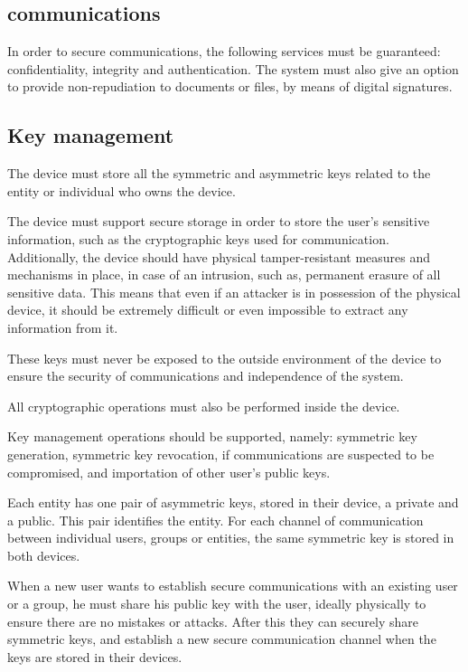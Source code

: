 \subsection{communications} \label{chap:problem:services:comms}
In order to secure communications, the following services must be guaranteed: confidentiality, integrity and authentication.
The system must also give an option to provide non-repudiation to documents or files, by means of digital signatures.


\subsection{Key management} \label{chap:problem:services:key}
The device must store all the symmetric and asymmetric keys related to the entity or individual who owns the device.

The device must support secure storage in order to store the user's sensitive information, such as the cryptographic keys used for communication.
Additionally, the device should have physical tamper-resistant measures and mechanisms in place, in case of an intrusion, such as, permanent erasure of all sensitive data. 
This means that even if an attacker is in possession of the physical device, it should be extremely difficult or even impossible to extract any information from it.

These keys must never be exposed to the outside environment of the device to ensure the security of communications and independence of the system.

All cryptographic operations must also be performed inside the device.

Key management operations should be supported, namely: symmetric key generation, symmetric key revocation, if communications are suspected to be compromised, and importation of other user's public keys.

Each entity has one pair of asymmetric keys, stored in their device, a private and a public. This pair identifies the entity.
For each channel of communication between individual users, groups or entities, the same symmetric key is stored in both devices.

When a new user wants to establish secure communications with an existing user or a group, he must share his public key with the user, ideally physically to ensure there are no mistakes or attacks. After this they can securely share symmetric keys, and establish a new secure communication channel when the keys are stored in their devices.

